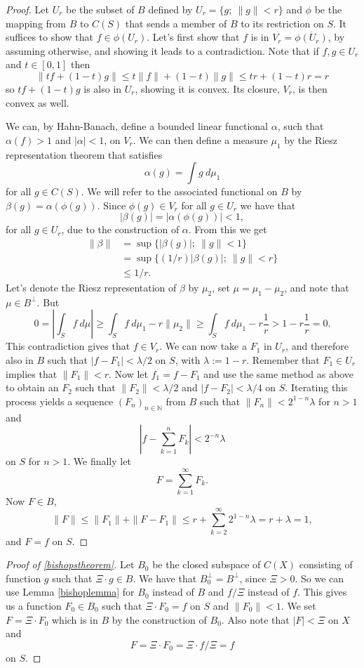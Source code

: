 \documentclass[a4paper,12pt,twoside,BCOR=10mm]{scrbook}
\theoremstyle{definition}
\theoremstyle{definition}
\theoremstyle{definition}
\begin{document}
\begin{proof}
Let $U_r$ be the subset of $B$ defined by $U_r = \{g;\ \|g\| < r\}$ and $\phi$ be the mapping from $B$ to $C(S)$ that sends a member of $B$ to its restriction on $S$.
It suffices to show that $f \in \phi(U_r)$.
Let's first show that $f$ is in $V_r = \overline{\phi(U_r)}$, by assuming otherwise, and showing it leads to a contradiction.
Note that if $f, g \in U_r$ and $t \in [0, 1]$ then
\[
	\|tf + (1 - t)g\| \leq t\|f\| + (1 - t)\|g\| \leq tr + (1 - t)r = r
\]
so $tf + (1 - t)g$ is also in $U_r$, showing it is convex.
Its closure, $V_r$, is then convex as well.

We can, by Hahn-Banach, define a bounded linear functional $\alpha$, such that $\alpha(f) > 1$ and $|\alpha| < 1$, on $V_r$.
We can then define a measure $\mu_1$ by the Riesz representation theorem that satisfies
\[
	\alpha(g) = \int g\ d\mu_1
\]
for all $g \in C(S)$.
We will refer to the associated functional on $B$ by $\beta(g) = \alpha(\phi(g))$.
Since $\phi(g) \in V_r$ for all $g \in U_r$ we have that
\[
	|\beta(g)| = |\alpha(\phi(g))| < 1,
\]
for all $g \in U_r$,
	due to the construction of $\alpha$.
From this we get
\begin{align*}
	\| \beta \|
	&= \sup \{ |\beta(g)|;\ \|g\| < 1 \}\\
	&= \sup \{ (1/r)|\beta(g)|;\ \|g\| < r \}\\
	&\leq 1/r.
\end{align*}
Let's
	denote the Riesz representation of $\beta$ by $\mu_2$,
	set $\mu = \mu_1 - \mu_2$,
	and note that $\mu \in B^{\bot}$.
But
\[
	0 = \left | \int_S f\ d\mu \right | 
		\geq \int_S f\ d\mu_1 - r\|\mu_2\| 
		\geq \int_S f\ d\mu_1 - r\frac{1}{r}
		> 1 - r \frac{1}{r} = 0.
\]
This contradiction gives that $f \in V_r$.
We can now take a $F_1$ in $U_r$, and therefore also in $B$ such that $|f - F_1| < \lambda/2$ on $S$, with $\lambda := 1 - r$.
Remember that $F_1 \in U_r$ implies that $\|F_1\| < r$.
Now let $f_1 = f - F_1$ and use the same method as above to obtain an $F_2$ such that $\|F_2\| < \lambda/2$ and $|f - F_2| < \lambda/4$ on $S$.
Iterating this process yields a sequence $(F_n)_{n \in \mathbb{N}}$ from $B$ such that $\|F_n\| < 2^{1 - n}\lambda$ for $n > 1$ and
\[
	\left | f - \sum_{k = 1}^n F_k \right | < 2^{-n}\lambda
\]
on $S$ for $n > 1$.
We finally let 
\[
F = \sum_{k = 1}^{\infty} F_k.
\]
Now $F \in B$,
\[
	\|F\| \leq \|F_1\| + \|F - F_1\| \leq r + \sum_{k = 2}^{\infty}2^{1 - n}\lambda = r + \lambda = 1,
\]
and $F = f$ on $S$.
\end{proof}
\begin{proof}[Proof of \ref{bishopstheorem}]
Let $B_0$ be the closed subspace of $C(X)$ consisting of function $g$ such that $\Xi \cdot g \in B$.
We have that $B_0^{\bot} = B^{\bot}$, since $\Xi > 0$.
So we can use Lemma \ref{bishoplemma} for $B_0$ instead of $B$ and $f/\Xi$ instead of $f$.
This gives us a function $F_0 \in B_0$ such that $\Xi \cdot F_0 = f$ on $S$ and $\|F_0\| < 1$.
We set $F = \Xi \cdot F_0$ which is in $B$ by the construction of $B_0$.
Also note that $|F| < \Xi$ on $X$ and 
\[
	F = \Xi \cdot F_0 = \Xi \cdot f/\Xi = f
\]
on $S$.
\end{proof}
\end{document}
